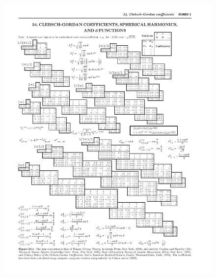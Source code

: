 \documentclass{article}
\begin{document}
   \onecolumn
   \begin{figure}
      \centering 
      \includegraphics{./clebrpp.pdf}
   \end{figure} 
\end{document}
